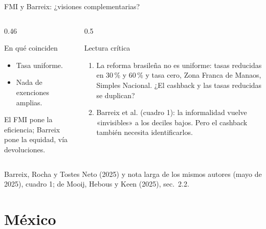 \documentclass[aspectratio=169,11pt]{beamer}
\newcommand{\fuente}[1]{\par\vfill{\small\color{cGris}#1\par}}
\begin{document}
\begin{frame}{FMI y Barreix: ¿visiones complementarias?}
  \begin{columns}[T]
    \begin{column}{0.46\textwidth}
      \begin{block}{En qué coinciden}
        \begin{itemize}
          \item Tasa uniforme.
          \item Nada de exenciones amplias.
        \end{itemize}
        El FMI pone la eficiencia; Barreix pone la equidad, vía devoluciones.
      \end{block}
    \end{column}
    \begin{column}{0.5\textwidth}
      \pause
      \begin{alertblock}{Lectura crítica}
        \begin{enumerate}
          \item La reforma brasileña no es uniforme: tasas reducidas en 30\,\% y 60\,\% y tasa cero, Zona Franca de Manaos, Simples Nacional. ¿El cashback y las tasas reducidas se duplican?
          \pause
          \item Barreix et al. (cuadro 1): la informalidad vuelve «invisibles» a los deciles bajos. Pero el cashback también necesita identificarlos.
        \end{enumerate}
      \end{alertblock}
    \end{column}
  \end{columns}
  \fuente{Barreix, Rocha y Tostes Neto (2025) y nota larga de los mismos autores (mayo de 2025), cuadro 1; de Mooij, Hebous y Keen (2025), sec.~2.2.}
\end{frame}

\section{México}
\end{document}
